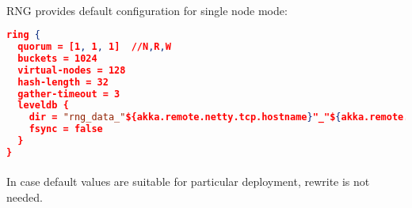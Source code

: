 \paragraph{}
RNG provides default configuration for single node mode:

\begin{lstlisting}[language=json,caption=Example]
ring {
  quorum = [1, 1, 1]  //N,R,W
  buckets = 1024
  virtual-nodes = 128
  hash-length = 32
  gather-timeout = 3
  leveldb {
    dir = "rng_data_"${akka.remote.netty.tcp.hostname}"_"${akka.remote.netty.tcp.port}
    fsync = false
  }
}
\end{lstlisting}

\paragraph{}
In case default values are suitable for particular deployment, rewrite is not needed.
